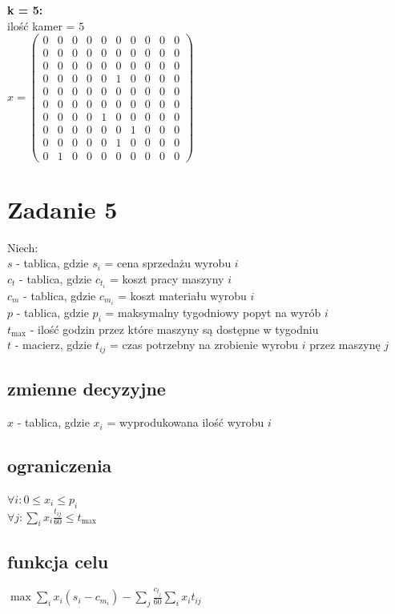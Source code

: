 \documentclass{report}
\begin{document}
\textbf{k = 5:}\\
ilość kamer = $5$\\
$x = \begin{pmatrix}
    0 & 0 & 0 & 0 & 0 & 0 & 0 & 0 & 0 & 0 \\
    0 & 0 & 0 & 0 & 0 & 0 & 0 & 0 & 0 & 0 \\
    0 & 0 & 0 & 0 & 0 & 0 & 0 & 0 & 0 & 0 \\
    0 & 0 & 0 & 0 & 0 & 1 & 0 & 0 & 0 & 0 \\
    0 & 0 & 0 & 0 & 0 & 0 & 0 & 0 & 0 & 0 \\
    0 & 0 & 0 & 0 & 0 & 0 & 0 & 0 & 0 & 0 \\
    0 & 0 & 0 & 0 & 1 & 0 & 0 & 0 & 0 & 0 \\
    0 & 0 & 0 & 0 & 0 & 0 & 1 & 0 & 0 & 0 \\
    0 & 0 & 0 & 0 & 0 & 1 & 0 & 0 & 0 & 0 \\
    0 & 1 & 0 & 0 & 0 & 0 & 0 & 0 & 0 & 0
    \end{pmatrix}$\\    
\section*{Zadanie 5}
Niech:\\
$s$ - tablica, gdzie
$s_i$ = cena sprzedażu wyrobu $i$\\
$c_t$ - tablica, gdzie
$c_{t_i}$ = koszt pracy maszyny $i$\\
$c_m$ - tablica, gdzie
$c_{m_i}$ = koszt materiału wyrobu $i$\\
$p$ - tablica, gdzie
$p_i$ = maksymalny tygodniowy popyt na wyrób $i$\\
$t_{\text{max}}$ - ilość godzin przez które maszyny są dostępne w tygodniu\\
$t$ - macierz, gdzie
$t_{ij}$ = czas potrzebny na zrobienie wyrobu $i$ przez maszynę $j$
\subsection*{zmienne decyzyjne}
$x$ - tablica, gdzie
$x_i$ = wyprodukowana ilość wyrobu $i$
\subsection*{ograniczenia}
$\forall i : 0 \le x_i \le p_i$\\
$\forall j : \sum_{i} x_i \frac{t_{ij}}{60} \le t_{\text{max}}$\\
\subsection*{funkcja celu}
$\max \sum_{i} x_i (s_i - c_{m_i}) - \sum_{j} \frac{c_{t_j}}{60} \sum_{i} x_i t_{ij}$
\end{document}
